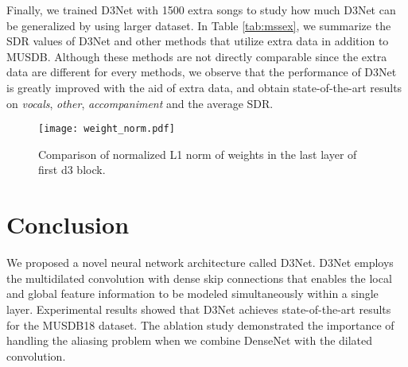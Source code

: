 \documentclass{article}
\begin{document}
Finally, we trained D3Net with 1500 extra songs to study how much D3Net can be generalized by using larger dataset. In Table \ref{tab:mssex}, we summarize the SDR values of D3Net and other methods that utilize extra data in addition to MUSDB. Although these methods are not directly comparable since the extra data are different for every methods, we observe that the performance of D3Net is greatly improved with the aid of extra data, and obtain state-of-the-art results on \textit{vocals}, \textit{other}, \textit{accompaniment} and the average SDR.


\begin{figure}[t]
  \centering
  \texttt{[image: weight\_norm.pdf]}
  \caption{Comparison of normalized L1 norm of weights in the last layer of first d3 block.}
  \label{fig:norm}
\end{figure}


\section{Conclusion}
We proposed a novel neural network architecture called D3Net. D3Net employs the multidilated convolution with dense skip connections that enables the local and global feature information to be modeled simultaneously within a single layer. Experimental results showed that D3Net achieves state-of-the-art results for the MUSDB18 dataset. The ablation study demonstrated the importance of handling the aliasing problem when we combine DenseNet with the dilated convolution.  


\itemsep 30pt 

\end{document}
